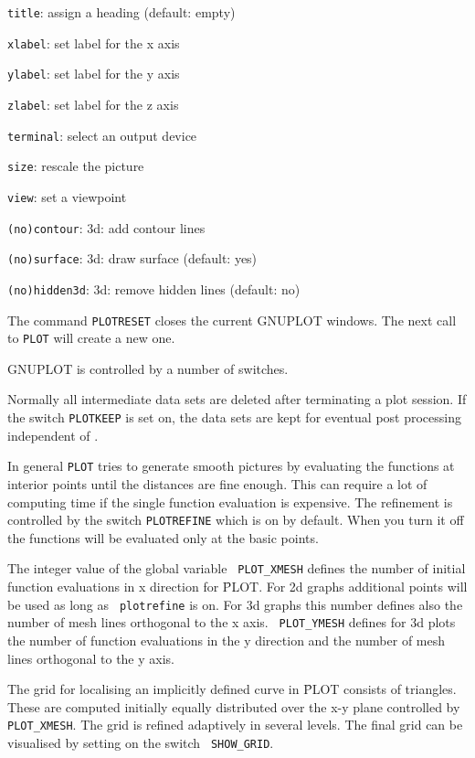 {\tt title}: assign a heading (default: empty)

{\tt xlabel}: set label for the x axis 

{\tt ylabel}: set label for the y axis

{\tt zlabel}: set label for the z axis

{\tt terminal}: select an output device 

{\tt size}: rescale the picture

{\tt view}: set a viewpoint

{\tt (no)}{\tt contour}: 3d: add contour lines

{\tt (no)}{\tt surface}: 3d: draw surface (default: yes)

{\tt (no)}{\tt hidden3d}: 3d: remove hidden lines (default: no)

The command {\tt PLOTRESET} closes the current
GNUPLOT windows.  The next call to {\tt PLOT} will create a new
one.

GNUPLOT is controlled by a number of switches.

Normally all intermediate data sets are deleted after terminating
a plot session. If the switch {\tt PLOTKEEP} is set on,
the data sets are kept for eventual post processing independent
of \REDUCE.

In general {\tt PLOT} tries to generate smooth pictures by evaluating
the functions at interior points until the distances are fine enough.
This can require a lot of computing time if the single function
evaluation is expensive.  The refinement is controlled by the switch
{\tt PLOTREFINE} which is on by default.  When you
turn it off the functions will be evaluated only at the basic points.

The integer value of the global variable {\tt
PLOT\_XMESH} defines the number of initial
function evaluations in x direction for \f{PLOT}.  For 2d graphs
additional points will be used as long as {\tt
plotrefine} is on.  For 3d graphs this number
defines also the number of mesh lines orthogonal to the x axis.  {\tt
PLOT\_YMESH} defines for 3d plots the number of
function evaluations in the y direction and the number of mesh lines
orthogonal to the y axis.

The grid for localising an implicitly defined curve in \f{PLOT}
consists of triangles.  These are computed initially equally
distributed over the x-y plane controlled by {\tt PLOT\_XMESH}.  The
grid is refined adaptively in several levels.  The final grid can be
visualised by setting on the switch {\tt
SHOW\_GRID}.

